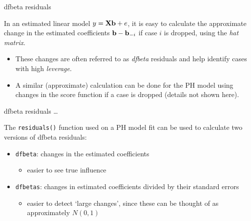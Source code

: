 \documentclass[ignorenonframetext,]{beamer}
\providecommand{\tightlist}{%
  \setlength{\itemsep}{0pt}\setlength{\parskip}{0pt}}
\begin{document}
\begin{frame}{%
\protect\hypertarget{dfbeta-residuals}{%
dfbeta residuals}}

In an estimated linear model \(y = {\bf X}{\bf b} + e\), it is easy to
calculate the approximate change in the estimated coefficients
\({\bf b} - {\bf b}_{-i}\) if case \(i\) is dropped, using the \emph{hat
matrix}.

\begin{itemize}
\item
  These changes are often referred to as \emph{dfbeta} residuals and
  help identify cases with high \emph{leverage}.
\item
  A similar (approximate) calculation can be done for the PH model using
  changes in the score function if a case is dropped (details not shown
  here).
\end{itemize}

\end{frame}

\begin{frame}{%
\protect\hypertarget{dfbeta-residuals-1}{%
dfbeta residuals \ldots}}

The \texttt{residuals()} function used on a PH model fit can be used to
calculate two versions of dfbeta residuals:

\begin{itemize}
\item
  \texttt{dfbeta}: changes in the estimated coefficients

  \begin{itemize}
  \tightlist
  \item
    easier to see true influence
  \end{itemize}
\item
  \texttt{dfbetas}: changes in estimated coefficients divided by their
  standard errors

  \begin{itemize}
  \tightlist
  \item
    easier to detect `large changes’, since these can be thought of as
    approximately \(N(0,1)\)
  \end{itemize}
\end{itemize}

\end{frame}
\end{document}
